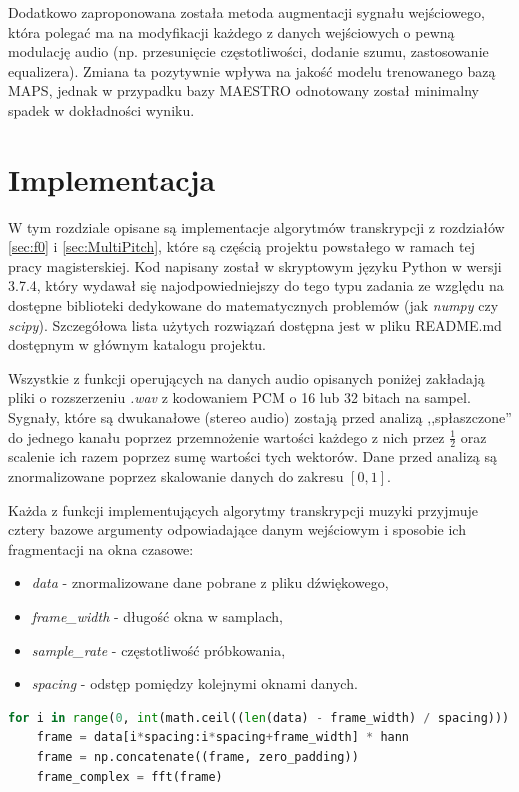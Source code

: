 \documentclass[12pt,a4paper,twoside]{mwart}
\begin{document}
Dodatkowo zaproponowana została metoda augmentacji sygnału wejściowego, która polegać ma na modyfikacji każdego z danych wejściowych o pewną modulację audio (np. przesunięcie częstotliwości, dodanie szumu, zastosowanie equalizera). Zmiana ta pozytywnie wpływa na jakość modelu trenowanego bazą MAPS, jednak w przypadku bazy MAESTRO odnotowany został minimalny spadek w dokładności wyniku. 

\clearpage

\section{Implementacja}\label{sec:impl}
W tym rozdziale opisane są implementacje algorytmów transkrypcji z rozdziałów \ref{sec:f0} i \ref{sec:MultiPitch}, które są częścią projektu powstałego w ramach tej pracy magisterskiej. Kod napisany został w skryptowym języku Python w wersji 3.7.4, który wydawał się najodpowiedniejszy do tego typu zadania ze względu na dostępne biblioteki dedykowane do matematycznych problemów (jak \textit{numpy} czy \textit{scipy}). Szczegółowa lista użytych rozwiązań dostępna jest w pliku README.md dostępnym w głównym katalogu projektu.

Wszystkie z funkcji operujących na danych audio opisanych poniżej zakładają pliki  o rozszerzeniu \textit{.wav} z kodowaniem PCM o 16 lub 32 bitach na sampel. Sygnały, które są dwukanałowe (stereo audio) zostają przed analizą ,,spłaszczone'' do jednego kanału poprzez przemnożenie wartości każdego z nich przez $\frac{1}{2}$ oraz scalenie ich razem poprzez sumę wartości tych wektorów. Dane przed analizą są znormalizowane poprzez skalowanie danych do zakresu $\left[0, 1\right]$.

Każda z funkcji implementujących algorytmy transkrypcji muzyki przyjmuje cztery bazowe argumenty odpowiadające danym wejściowym i sposobie ich fragmentacji na okna czasowe:
\begin{itemize}
  \item \textit{data} - znormalizowane dane pobrane z pliku dźwiękowego,
  \item \textit{frame\_width} - długość okna w samplach,
  \item \textit{sample\_rate} - częstotliwość próbkowania,
  \item \textit{spacing} - odstęp pomiędzy kolejnymi oknami danych.
\end{itemize}

\begin{lstlisting}[language=Python, caption={Przykład pętli po danych wejściowych z uwzględnieniem okna czasowego. Takie dzielenie danych, z nakładaniem funkcji okna i dodaniem marginesu zer jest wykonywane w większości zaimplementowanych algorytmów.}, captionpos=b, label={code:iter}]
  for i in range(0, int(math.ceil((len(data) - frame_width) / spacing))):
    frame = data[i*spacing:i*spacing+frame_width] * hann
    frame = np.concatenate((frame, zero_padding))
    frame_complex = fft(frame)
\end{lstlisting}
\end{document}
